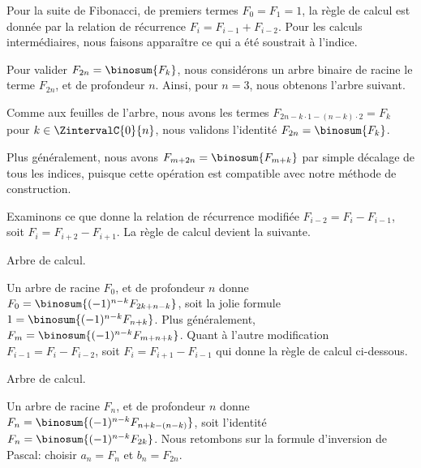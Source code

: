 Pour la suite de Fibonacci, de premiers termes $F_0 = F_1 = 1$, la règle de calcul est donnée par la relation de récurrence $F_{i} = F_{i-1} + F_{i-2}$.
%
Pour les calculs intermédiaires, nous faisons apparaître ce qui a été soustrait à l'indice.

%
            {\intertree}{}

Pour valider $F_{2n} = \binosum{F_k}$, nous considérons un arbre binaire de racine le terme $F_{2n}$, et de profondeur $n$.
Ainsi, pour $n=3$, nous obtenons l'arbre suivant.


Comme aux feuilles de l'arbre, nous avons les termes
$F_{2n - k\cdot1 - (n-k)\cdot2} = F_k$
pour $k \in \ZintervalC{0}{n}$,
nous validons l'identité
$F_{2n} = \binosum{F_k}$.


\begin{remark}
    Plus généralement, nous avons
    $F_{m+2n} = \binosum{F_{m+k}}$
    par simple décalage de tous les indices,
    puisque cette opération est compatible avec notre méthode de construction.
\end{remark}




\begin{remark}
    Examinons ce que donne la relation de récurrence modifiée $F_{i-2} = F_{i} - F_{i-1}$, soit $F_i = F_{i+2} - F_{i+1}$.
    La règle de calcul devient la suivante.

    \begin{center}
        \itshape\centering


        Arbre de calcul.
    \end{center}

    Un arbre de racine $F_0$, et de profondeur $n$ donne
    $F_{0} = \binosum{(-1)^{n-k} F_{2k + n - k}}$,
    soit la jolie formule
    $1 = \binosum{(-1)^{n-k} F_{n + k}}$.
    Plus généralement,
    $F_{m} = \binosum{(-1)^{n-k} F_{m + n + k}}$.
    Quant à l'autre modification $F_{i-1} = F_{i} - F_{i-2}$, soit $F_i = F_{i+1} - F_{i-1}$ qui donne la règle de calcul ci-dessous.

    \begin{center}
        \itshape\centering


        Arbre de calcul.
    \end{center}

    Un arbre de racine $F_n$, et de profondeur $n$ donne
    $F_{n} = \binosum{(-1)^{n-k} F_{n + k - (n - k)}}$,
    soit l'identité
    $F_{n} = \binosum{(-1)^{n-k} F_{2 k}}$.
    Nous retombons sur la formule d'inversion de Pascal:
    choisir $a_n = F_n$ et $b_n = F_{2n}$.
\end{remark}



